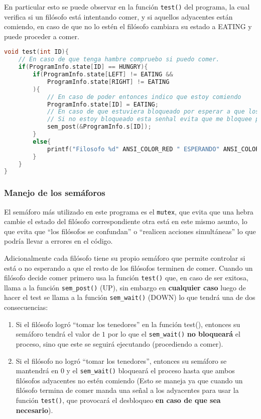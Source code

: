 En particular esto se puede observar en la función \texttt{test()} del programa, la cual verifica si un filósofo está intentando comer, y si aquellos adyacentes están comiendo, en caso de que no lo estén el filósofo cambiara su estado a EATING y puede proceder a comer.

\begin{lstlisting}[style=CodeStyle, caption={Función para revisar si filosofo i tiene la posibilidad de comer}, label={lst:FuncionTest}, language=C]
void test(int ID){
    // En caso de que tenga hambre compruebo si puedo comer.
    if(ProgramInfo.state[ID] == HUNGRY){
        if(ProgramInfo.state[LEFT] != EATING &&
            ProgramInfo.state[RIGHT] != EATING
        ){
            // En caso de poder entonces indico que estoy comiendo
            ProgramInfo.state[ID] = EATING;
            // En caso de que estuviera bloqueado por esperar a que los demas terminen de comer entonces me desbloqueo
            // Si no estoy bloqueado esta senhal evita que me bloquee por accion de la funcion "take\_forks()"
            sem_post(&ProgramInfo.s[ID]);
        }
        else{
            printf("Filosofo %d" ANSI_COLOR_RED " ESPERANDO" ANSI_COLOR_RESET "\n", ID);
        }
    }
}
\end{lstlisting}

\subsubsection*{Manejo de los semáforos}
El semáforo más utilizado en este programa es el \texttt{mutex}, que evita que una hebra cambie el estado del filósofo correspondiente otra está en este mismo asunto, lo que evita que ``los filósofos se confundan'' o ``realicen acciones simultáneas'' lo que podría llevar a errores en el código.

Adicionalmente cada filósofo tiene su propio semáforo que permite controlar si está o no esperando a que el resto de los filósofos terminen de comer. Cuando un filósofo decide comer primero usa la función \texttt{test()} que, en caso de ser exitosa, llama a la función \texttt{sem\_post()} (UP), sin embargo en \textbf{cualquier caso} luego de hacer el test se llama a la función \texttt{sem\_wait()} (DOWN) lo que tendrá una de dos consecuencias:
\begin{enumerate}
    \item Si el filósofo logró ``tomar los tenedores'' en la función test(), entonces su semáforo tendrá el valor de $1$ por lo que el \texttt{sem\_wait()} \textbf{no bloqueará} el proceso, sino que este se seguirá ejecutando (procediendo a comer).
    \item Si el filósofo no logró ``tomar los tenedores'', entonces su semáforo se mantendrá en $0$ y el \texttt{sem\_wait()} bloqueará el proceso hasta que ambos filósofos adyacentes no estén comiendo (Esto se maneja ya que cuando un filósofo termina de comer manda una señal a los adyacentes para usar la función \texttt{test()}, que provocará el desbloqueo \textbf{en caso de que sea necesario}).
\end{enumerate}

